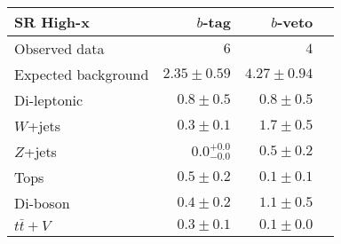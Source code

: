 \begin{tabular*}{\textwidth}{@{\extracolsep{\fill}}lrrr}
\toprule
\textbf{SR High-x} & $b$-tag & $b$-veto \\
\midrule

Observed data & $6$ & $4$ \\
\midrule
Expected background & $2.35 \pm 0.59$ & $4.27 \pm 0.94$ \\
\midrule
Di-leptonic & $0.8 \pm 0.5$ & $0.8 \pm 0.5$ \\
$W$+jets & $0.3 \pm 0.1$ & $1.7 \pm 0.5$ \\
$Z$+jets & $0.0_{-0.0}^{+0.0}$ & $0.5 \pm 0.2$ \\
Tops & $0.5 \pm 0.2$ & $0.1 \pm 0.1$ \\
Di-boson & $0.4 \pm 0.2$ & $1.1 \pm 0.5$ \\
$t\bar{t}+V$ & $0.3 \pm 0.1$ & $0.1 \pm 0.0$ \\


\bottomrule
\end{tabular*}




